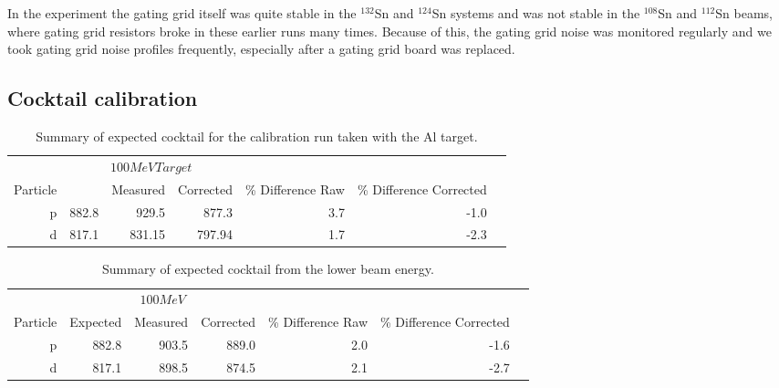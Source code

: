 In the experiment the gating grid itself was quite stable in the  ${}^{132}$Sn and ${}^{124}$Sn systems and was not stable in the ${}^{108}$Sn and ${}^{112}$Sn beams, where gating grid resistors broke in these earlier runs many times. Because of this, the gating grid noise was monitored regularly and we took gating grid noise profiles frequently, especially after a gating grid board was replaced. 



\subsection{Cocktail calibration}
\label{sec:cocktail}

\begin{table*}\centering
{}
\begin{tabular}{@{}rrrrrrr@{}}\toprule
& \multicolumn{3}{c}{$100 MeV Target$}\\
\cmidrule{2-4}
Particle &\phantom{abc} & Measured & Corrected & \% Difference Raw & \% Difference Corrected\\
\midrule
p   & 882.8 & 929.5 & 877.3   &  3.7  & -1.0  \\
d   & 817.1 & 831.15 & 797.94 &  1.7  & -2.3\\
\bottomrule
\end{tabular}
\caption{Summary of expected cocktail for the calibration run taken with the Al target. }
\label{tb:cocktail100tar}
\end{table*}

\begin{table*}\centering
{}
\begin{tabular}{@{}rrrrrrr@{}}\toprule
& \multicolumn{3}{c}{$100 MeV$}\\
\cmidrule{2-4}
Particle & Expected & Measured & Corrected & \% Difference Raw & \% Difference Corrected\\
\midrule
p   & 882.8 & 903.5 & 889.0 &  2.0   & -1.6  \\
d   & 817.1 & 898.5 & 874.5 &  2.1   & -2.7\\
\bottomrule
\end{tabular}
\caption{Summary of expected cocktail from the lower beam energy.}
\label{tb:cocktail100}
\end{table*}

